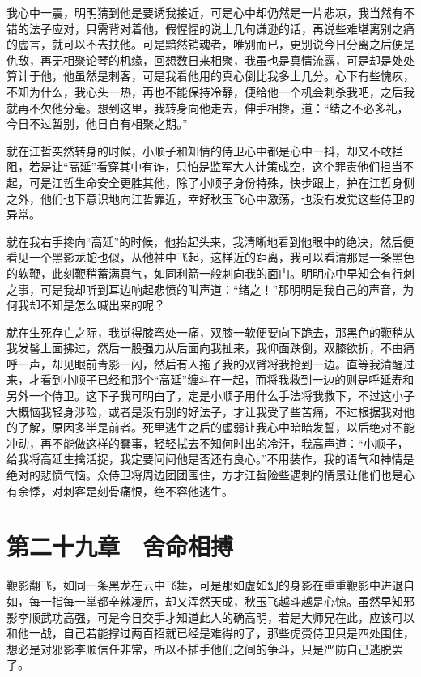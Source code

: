 我心中一震，明明猜到他是要诱我接近，可是心中却仍然是一片悲凉，我当然有不错的法子应对，只需背对着他，假惺惺的说上几句谦逊的话，再说些难堪离别之痛的虚言，就可以不去扶他。可是黯然销魂者，唯别而已，更别说今日分离之后便是仇敌，再无相聚论琴的机缘，回想数日来相聚，我虽也是真情流露，可是却是处处算计于他，他虽然是刺客，可是我看他用的真心倒比我多上几分。心下有些愧疚，不知为什么，我心头一热，再也不能保持冷静，便给他一个机会刺杀我吧，之后我就再不欠他分毫。想到这里，我转身向他走去，伸手相搀，道：“绪之不必多礼，今日不过暂别，他日自有相聚之期。”

就在江哲突然转身的时候，小顺子和知情的侍卫心中都是心中一抖，却又不敢拦阻，若是让“高延”看穿其中有诈，只怕是监军大人计策成空，这个罪责他们担当不起，可是江哲生命安全更胜其他，除了小顺子身份特殊，快步跟上，护在江哲身侧之外，他们也下意识地向江哲靠近，幸好秋玉飞心中激荡，也没有发觉这些侍卫的异常。

就在我右手搀向“高延”的时候，他抬起头来，我清晰地看到他眼中的绝决，然后便看见一个黑影龙蛇也似，从他袖中飞起，这样近的距离，我可以看清那是一条黑色的软鞭，此刻鞭稍蓄满真气，如同利箭一般刺向我的面门。明明心中早知会有行刺之事，可是我却听到耳边响起悲愤的叫声道：“绪之！”那明明是我自己的声音，为何我却不知是怎么喊出来的呢？

就在生死存亡之际，我觉得膝弯处一痛，双膝一软便要向下跪去，那黑色的鞭稍从我发髻上面拂过，然后一股强力从后面向我扯来，我仰面跌倒，双膝欲折，不由痛呼一声，却见眼前青影一闪，然后有人拖了我的双臂将我抢到一边。直等我清醒过来，才看到小顺子已经和那个“高延”缠斗在一起，而将我救到一边的则是呼延寿和另外一个侍卫。这下子我可明白了，定是小顺子用什么手法将我救下，不过这小子大概恼我轻身涉险，或者是没有别的好法子，才让我受了些苦痛，不过根据我对他的了解，原因多半是前者。死里逃生之后的虚弱让我心中暗暗发誓，以后绝对不能冲动，再不能做这样的蠢事，轻轻拭去不知何时出的冷汗，我高声道：“小顺子，给我将高延生擒活捉，我定要问问他是否还有良心。”不用装作，我的语气和神情是绝对的悲愤气恼。众侍卫将周边团团围住，方才江哲险些遇刺的情景让他们也是心有余悸，对刺客是刻骨痛恨，绝不容他逃生。

\chapter{第二十九章　舍命相搏}

鞭影翻飞，如同一条黑龙在云中飞舞，可是那如虚如幻的身影在重重鞭影中进退自如，每一指每一掌都辛辣凌厉，却又浑然天成，秋玉飞越斗越是心惊。虽然早知邪影李顺武功高强，可是今日交手才知道此人的确高明，若是大师兄在此，应该可以和他一战，自己若能撑过两百招就已经是难得的了，那些虎赍侍卫只是四处围住，想必是对邪影李顺信任非常，所以不插手他们之间的争斗，只是严防自己逃脱罢了。

